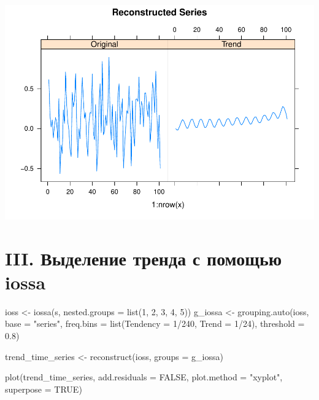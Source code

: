 \documentclass[specialist,
               substylefile = spbu_report.rtx,
               subf,href,colorlinks=true, 12pt]{disser}
\theoremstyle{definition}
\newenvironment{Shaded}{\begin{snugshade}}{\end{snugshade}}
\newcommand{\AttributeTok}[1]{\textcolor[rgb]{0.77,0.63,0.00}{#1}}
\newcommand{\ConstantTok}[1]{\textcolor[rgb]{0.00,0.00,0.00}{#1}}
\newcommand{\DecValTok}[1]{\textcolor[rgb]{0.00,0.00,0.81}{#1}}
\newcommand{\FloatTok}[1]{\textcolor[rgb]{0.00,0.00,0.81}{#1}}
\newcommand{\FunctionTok}[1]{\textcolor[rgb]{0.00,0.00,0.00}{#1}}
\newcommand{\NormalTok}[1]{#1}
\newcommand{\OtherTok}[1]{\textcolor[rgb]{0.56,0.35,0.01}{#1}}
\newcommand{\SpecialCharTok}[1]{\textcolor[rgb]{0.00,0.00,0.00}{#1}}
\newcommand{\StringTok}[1]{\textcolor[rgb]{0.31,0.60,0.02}{#1}}
\begin{document}
\includegraphics{iossa_example/decomposition-1.pdf}

\hypertarget{iii.-ux432ux44bux434ux435ux43bux435ux43dux438ux435-ux442ux440ux435ux43dux434ux430-ux441-ux43fux43eux43cux43eux449ux44cux44e-iossa}{%
\section{III. Выделение тренда с помощью
iossa}\label{iii.-ux432ux44bux434ux435ux43bux435ux43dux438ux435-ux442ux440ux435ux43dux434ux430-ux441-ux43fux43eux43cux43eux449ux44cux44e-iossa}}

\begin{Shaded}
\begin{Highlighting}[]
\NormalTok{  ioss }\OtherTok{\textless{}{-}} \FunctionTok{iossa}\NormalTok{(s, }\AttributeTok{nested.groups =} \FunctionTok{list}\NormalTok{(}\DecValTok{1}\NormalTok{, }\DecValTok{2}\NormalTok{, }\DecValTok{3}\NormalTok{, }\DecValTok{4}\NormalTok{, }\DecValTok{5}\NormalTok{))}
\NormalTok{  g\_iossa }\OtherTok{\textless{}{-}} \FunctionTok{grouping.auto}\NormalTok{(ioss, }\AttributeTok{base =} \StringTok{"series"}\NormalTok{, }
                 \AttributeTok{freq.bins =} \FunctionTok{list}\NormalTok{(}\AttributeTok{Tendency =} \DecValTok{1}\SpecialCharTok{/}\DecValTok{240}\NormalTok{, }\AttributeTok{Trend =} \DecValTok{1}\SpecialCharTok{/}\DecValTok{24}\NormalTok{), }
                 \AttributeTok{threshold =} \FloatTok{0.8}\NormalTok{)}
                 
\NormalTok{  trend\_time\_series }\OtherTok{\textless{}{-}} \FunctionTok{reconstruct}\NormalTok{(ioss, }\AttributeTok{groups =}\NormalTok{ g\_iossa)}
  
  \FunctionTok{plot}\NormalTok{(trend\_time\_series, }
   \AttributeTok{add.residuals =} \ConstantTok{FALSE}\NormalTok{, }
   \AttributeTok{plot.method =} \StringTok{"xyplot"}\NormalTok{, }\AttributeTok{superpose =} \ConstantTok{TRUE}\NormalTok{)}
\end{Highlighting}
\end{Shaded}
\end{document}
